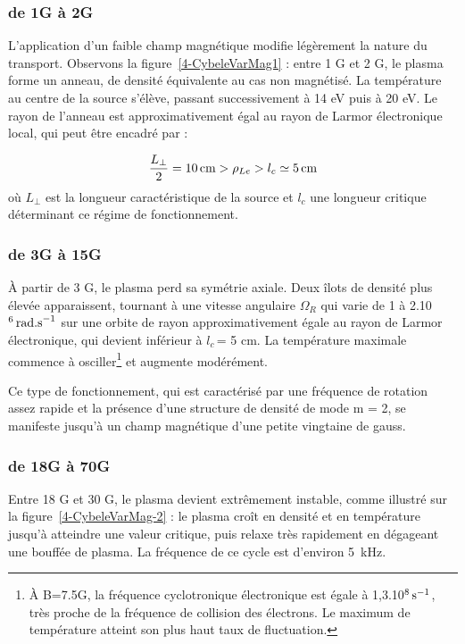 \begin{refsection}
\subsubsection{de 1G à 2G}

L'application d'un faible champ magnétique modifie légèrement la nature du
transport. Observons la figure~\ref{4-CybeleVarMag1} : entre 1 G et 2 G, le
plasma forme un anneau, de densité équivalente au cas non
magnétisé. La température au centre de la source s'élève, passant 
successivement à 14 eV puis à 20 eV. Le rayon de l'anneau est approximativement
égal au rayon de Larmor électronique local, qui peut être encadré par :

\begin{equation}
\frac{L_\perp}{2}=10\,\text{cm}>\rho{_{Le}}>l_c\simeq 5\,\text{cm}
\end{equation}
où $L_\perp$ est la longueur caractéristique de la source et $l_c$ une longueur
critique déterminant ce régime de fonctionnement. 

\subsubsection{de 3G à 15G}
À partir de 3 G, le plasma perd sa symétrie axiale. Deux îlots de densité plus
élevée apparaissent, tournant à une vitesse angulaire $\Omega_R$ qui varie de 1
à 2.10$^{{6}}\,\text{rad.s}^{{-1}}$ sur une orbite de rayon
approximativement égale au rayon de Larmor électronique, qui devient inférieur
à $l_c\,$= 5 cm. La température maximale commence à osciller\footnote{À B=7.5G,
la fréquence cyclotronique électronique est égale à
1,3.10$^{{8}}\,\text{s}^{{-1}}$, très proche de la fréquence de
collision des électrons. Le maximum de température atteint son plus haut taux
de fluctuation.} et augmente modérément.

Ce type de fonctionnement, qui est caractérisé par une
fréquence de rotation assez rapide et la présence d'une structure de densité de
mode m = 2, se manifeste jusqu'à un champ magnétique d'une petite vingtaine de
gauss. 


\subsubsection{de 18G à 70G}
Entre 18 G et 30 G, le plasma devient extrêmement instable, comme illustré
sur la figure~\ref{4-CybeleVarMag-2} : le plasma croît en
densité et en température jusqu'à atteindre une valeur critique, puis relaxe
très rapidement en dégageant une bouffée de plasma. La fréquence de ce cycle
est d'environ 5~kHz.


\end{refsection}

